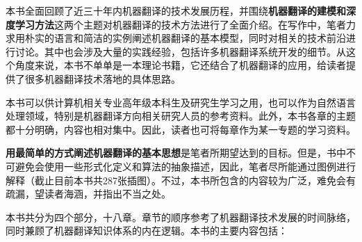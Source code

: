 \begin{spacing}{1.18}

本书全面回顾了近三十年内机器翻译的技术发展历程，并围绕{\sffamily\bfseries 机器翻译的建模和深度学习方法}这两个主题对机器翻译的技术方法进行了全面介绍。在写作中，笔者力求用朴实的语言和简洁的实例阐述机器翻译的基本模型，同时对相关的技术前沿进行讨论。其中也会涉及大量的实践经验，包括许多机器翻译系统开发的细节。从这个角度来说，本书不单单是一本理论书籍，它还结合了机器翻译的应用，给读者提供了很多机器翻译技术落地的具体思路。

本书可以供计算机相关专业高年级本科生及研究生学习之用，也可以作为自然语言处理领域，特别是机器翻译方向相关研究人员的参考资料。此外，本书各章的主题都十分明确，内容也相对集中。因此，读者也可将每章作为某一专题的学习资料。

{\sffamily\bfseries 用最简单的方式阐述机器翻译的基本思想}是笔者所期望达到的目标。但是，书中不可避免会使用一些形式化定义和算法的抽象描述，因此，笔者尽所能通过图例进行解释（截止目前本书共287张插图）。不过，本书所包含的内容较为广泛，难免会有疏漏，望读者海涵，并指出不当之处。

本书共分为四个部分，十八章。章节的顺序参考了机器翻译技术发展的时间脉络，同时兼顾了机器翻译知识体系的内在逻辑。本书的主要内容包括：


\end{spacing}
